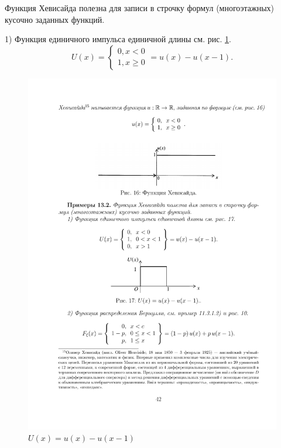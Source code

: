 \begin{example}
\label{ex:13.2}

	Функция Хевисайда полезна для записи в строчку формул (многоэтажных) кусочно заданных функций.

1) Функция единичного импульса единичной длины см. рис. \ref{fig17}.
\begin{equation*}
U(x) = 
 \begin{cases}
   0,x<0\\
   1,x\geqslant 0 
 \end{cases}
 =u(x)-u(x-1).
\end{equation*}

\begin{figure}[H]
	\centering
	\includegraphics[]{pic/pic17}
	\caption{$U(x) = u(x)-u(x-1)$}
	\label{fig17}
\end{figure}


\end{example}

